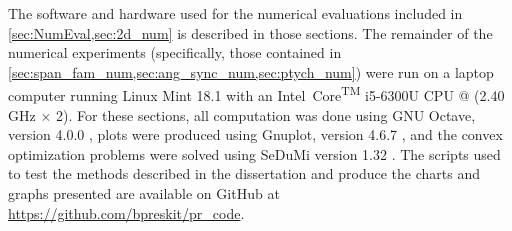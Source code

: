 The software and hardware used for the numerical evaluations included in \cref{sec:NumEval,sec:2d_num} is described in those sections.  The remainder of the numerical experiments (specifically, those contained in \cref{sec:span_fam_num,sec:ang_sync_num,sec:ptych_num}) were run on a laptop computer running Linux Mint 18.1 with an Intel\textcopyright~Core\textsuperscript{TM} i5-6300U CPU @ (2.40 GHz $\times$ 2).  For these sections, all computation was done using GNU Octave, version 4.0.0 \cite{eaton2015octave}, plots were produced using Gnuplot, version 4.6.7 \cite{williams2015gnuplot}, and the convex optimization problems were solved using SeDuMi version 1.32 \cite{sturm1999sedumi}.  The scripts used to test the methods described in the dissertation and produce the charts and graphs presented are available on GitHub at \url{https://github.com/bpreskit/pr_code}.
